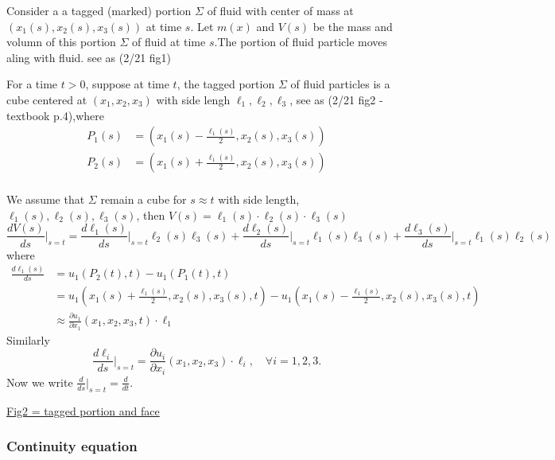 Consider a a tagged (marked) portion $\Sigma$ of fluid with center of mass at $(x_1(s), x_2(s), x_3(s))$ at time $s$. Let $m(x)$ and $V(s)$ be the mass and volumn of this portion $\Sigma$ of fluid at time $s$.The portion of fluid particle moves aling with fluid. see as (2/21 fig1)

For a time $t>0$, suppose at time $t $, the tagged portion $\Sigma$ of fluid particles is a cube centered at $(x_1, x_2, x_3)$ with side lengh $\ell_1,\ell_2,\ell_3$​, see as (2/21 fig2 - textbook p.4),where 
\begin{equation}
\begin{aligned}
P_1(s) &= \left(x_1(s)-\frac{\ell_1(s)}{2},x_2(s),x_3(s)\right)\\
P_2(s) &= \left(x_1(s)+\frac{\ell_1(s)}{2},x_2(s),x_3(s)\right)\\
\end{aligned}
\end{equation}



We assume that $\Sigma$ remain a cube for $s\approx t$ with side length, $\ell_1(s),\ell_2(s),\ell_3(s)$, then $V(s) = \ell_1(s)\cdot\ell_2(s)\cdot\ell_3(s)$
\begin{equation}
\frac{dV(s)}{ds}\Bigg|_{s=t}
=   \frac{d\ell_1(s)}{ds}\Bigg|_{s=t} \ell_2(s)\ell_3(s)
+\frac{d\ell_2(s)}{ds}\Bigg|_{s=t} \ell_1(s)\ell_3(s)
+\frac{d\ell_3(s)}{ds}\Bigg|_{s=t} \ell_1(s)\ell_2(s)
\end{equation}
where
\begin{equation}
\begin{aligned}
\frac{d\ell_1(s)}{ds}
&= u_1(P_2(t),t) - u_1(P_1(t),t)\\
&= u_1\left(x_1(s)+\frac{\ell_1(s)}{2},x_2(s),x_3(s),t\right)
- u_1\left(x_1(s)-\frac{\ell_1(s)}{2},x_2(s),x_3(s),t\right)\\
&\approx \frac{\partial u_1}{\partial x_1}\left(x_1,x_2,x_3,t\right)\cdot \ell_1
\end{aligned}
\end{equation}
Similarly 
\begin{equation}
\frac{d\ell_i}{ds}\Bigg|_{s=t} = \frac{\partial u_i}{\partial x_i}\left(x_1,x_2,x_3\right)\cdot \ell_{i},\quad \forall i=1,2,3.
\end{equation}
Now we write $\displaystyle \frac{d}{ds}\Bigg|_{s=t}=\frac{d}{dt}$​.

\underline{Fig2 = tagged portion and face}

\subsubsection{Continuity equation} %


